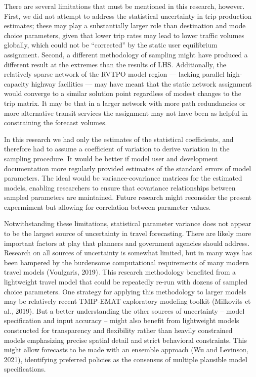 \documentclass[
  futuretransp,
  submit,
  moreauthors,
]{Definitions/mdpi}
\begin{document}
There are several limitations that must be mentioned in this research,
however. First, we did not attempt to address the statistical
uncertainty in trip production estimates; these may play a substantially
larger role than destination and mode choice parameters, given that
lower trip rates may lead to lower traffic volumes globally, which could
not be ``corrected'' by the static user equilibrium assignment. Second, a different
methodology of sampling might have produced a different result at the extremes than
the results of LHS.
Additionally, the relatively sparse network of the RVTPO model region
--- lacking parallel high-capacity highway facilities --- may have meant
that the static network assignment would converge to a similar solution
point regardless of modest changes to the trip matrix. It may be that in
a larger network with more path redundancies or more alternative transit services
the assignment may not have been as helpful in constraining the forecast
volumes.

In this research we had only the estimates of the statistical
coefficients, and therefore had to assume a coefficient of variation to
derive variation in the sampling procedure. It would be better if model
user and development documentation more regularly provided estimates of
the standard errors of model parameters. The ideal would be
variance-covariance matrices for the estimated models, enabling
researchers to ensure that covariance relationships between sampled
parameters are maintained. Future research might reconsider the present 
expermiment but allowing for correlation between parameter values.

Notwithstanding these limitations, statistical parameter variance does
not appear to be the largest source of uncertainty in travel
forecasting. There are likely more important factors at play that
planners and government agencies should address. Research on all sources
of uncertainty is somewhat limited, but in many ways has been hampered
by the burdensome computational requirements of many modern travel
models (Voulgaris, 2019). This research methodology benefited from a
lightweight travel model that could be repeatedly re-run with dozens of
sampled choice parameters. One strategy for applying this methodology to
larger models may be relatively recent TMIP-EMAT exploratory modeling
toolkit (Milkovits et al., 2019). But a better understanding the other
sources of uncertainty -- model specification and input accuracy --
might also benefit from lightweight models constructed for transparency
and flexibility rather than heavily constrained models emphasizing
precise spatial detail and strict behavioral constraints. This might
allow forecasts to be made with an ensemble approach (Wu and Levinson,
2021), identifying preferred policies as the consensus of multiple
plausible model specifications.
\end{document}
